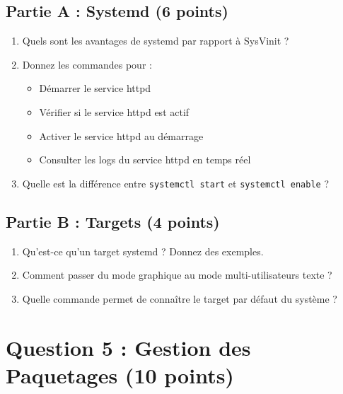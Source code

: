 \documentclass[12pt,a4paper]{article}
\begin{document}
\begin{questionbox}
\subsection*{Partie A : Systemd (6 points)}
\begin{enumerate}[label=\alph*)]
    \item Quels sont les avantages de systemd par rapport à SysVinit ?
    \item Donnez les commandes pour :
    \begin{itemize}
        \item Démarrer le service httpd
        \item Vérifier si le service httpd est actif
        \item Activer le service httpd au démarrage
        \item Consulter les logs du service httpd en temps réel
    \end{itemize}
    \item Quelle est la différence entre \texttt{systemctl start} et \texttt{systemctl enable} ?
\end{enumerate}

\subsection*{Partie B : Targets (4 points)}
\begin{enumerate}[label=\alph*)]
    \item Qu'est-ce qu'un target systemd ? Donnez des exemples.
    \item Comment passer du mode graphique au mode multi-utilisateurs texte ?
    \item Quelle commande permet de connaître le target par défaut du système ?
\end{enumerate}
\end{questionbox}

\newpage


\section{Question 5 : Gestion des Paquetages (10 points)}
\end{document}
